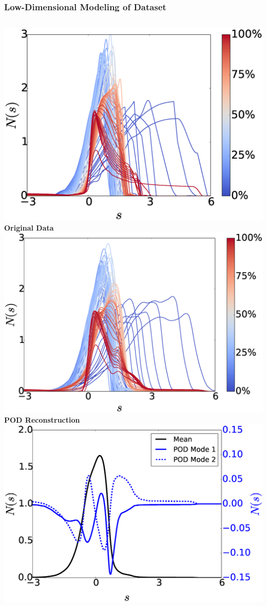 \documentclass[9pt]{beamer}
\begin{document}
\begin{frame}
\frametitle{Low-Dimensional Modeling of Dataset}
\label{sec-3-2}

\begin{columns}[c]
    \centering
    \includegraphics[width=1.3\textwidth]{HornsUnaligned} \\
    \bf{Original Data}
    \centering
    \includegraphics[width=1.25\textwidth]{PODReconstruction2} \\
    {\bf POD Reconstruction}
    \centering
    \includegraphics[width=1.25\textwidth]{PODModes} \\

\end{columns}
\end{frame}
\end{document}
